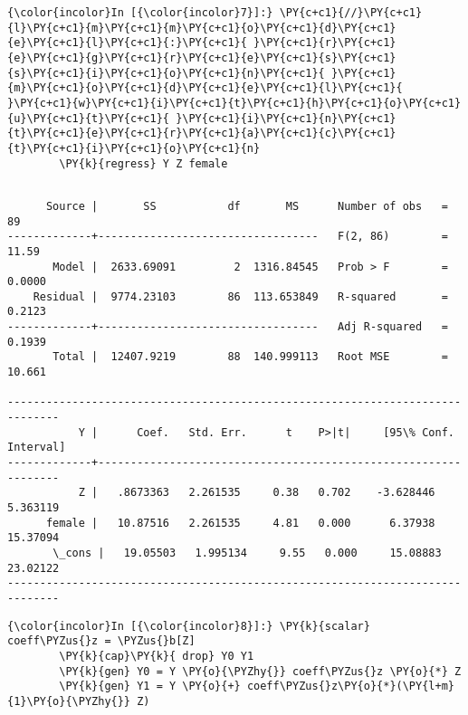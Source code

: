 \documentclass[11pt,notitlepage]{article}\usepackage[]{graphicx}\usepackage[]{color}
\makeatletter
\newenvironment{kframe}{%
 \def\at@end@of@kframe{}%
 \ifinner\ifhmode%
  \def\at@end@of@kframe{\end{minipage}}%
  \begin{minipage}{\columnwidth}%
 \fi\fi%
 \def\FrameCommand##1{\hskip\@totalleftmargin \hskip-\fboxsep
 \colorbox{shadecolor}{##1}\hskip-\fboxsep
     \hskip-\linewidth \hskip-\@totalleftmargin \hskip\columnwidth}%
 \MakeFramed {\advance\hsize-\width
   \@totalleftmargin\z@ \linewidth\hsize
   \@setminipage}}%
 {\par\unskip\endMakeFramed%
 \at@end@of@kframe}
\newenvironment{knitrout}{}{} %
\makeatother
\begin{document}
\begin{enumerate}[a)]
\begin{knitrout}
\begin{kframe}
    \begin{Verbatim}[commandchars=\\\{\}]
{\color{incolor}In [{\color{incolor}7}]:} \PY{c+c1}{//}\PY{c+c1}{l}\PY{c+c1}{m}\PY{c+c1}{m}\PY{c+c1}{o}\PY{c+c1}{d}\PY{c+c1}{e}\PY{c+c1}{l}\PY{c+c1}{:}\PY{c+c1}{ }\PY{c+c1}{r}\PY{c+c1}{e}\PY{c+c1}{g}\PY{c+c1}{r}\PY{c+c1}{e}\PY{c+c1}{s}\PY{c+c1}{s}\PY{c+c1}{i}\PY{c+c1}{o}\PY{c+c1}{n}\PY{c+c1}{ }\PY{c+c1}{m}\PY{c+c1}{o}\PY{c+c1}{d}\PY{c+c1}{e}\PY{c+c1}{l}\PY{c+c1}{ }\PY{c+c1}{w}\PY{c+c1}{i}\PY{c+c1}{t}\PY{c+c1}{h}\PY{c+c1}{o}\PY{c+c1}{u}\PY{c+c1}{t}\PY{c+c1}{ }\PY{c+c1}{i}\PY{c+c1}{n}\PY{c+c1}{t}\PY{c+c1}{e}\PY{c+c1}{r}\PY{c+c1}{a}\PY{c+c1}{c}\PY{c+c1}{t}\PY{c+c1}{i}\PY{c+c1}{o}\PY{c+c1}{n}
        \PY{k}{regress} Y Z female
\end{Verbatim}

    \begin{Verbatim}[commandchars=\\\{\}]

      Source |       SS           df       MS      Number of obs   =        89
-------------+----------------------------------   F(2, 86)        =     11.59
       Model |  2633.69091         2  1316.84545   Prob > F        =    0.0000
    Residual |  9774.23103        86  113.653849   R-squared       =    0.2123
-------------+----------------------------------   Adj R-squared   =    0.1939
       Total |  12407.9219        88  140.999113   Root MSE        =    10.661

------------------------------------------------------------------------------
           Y |      Coef.   Std. Err.      t    P>|t|     [95\% Conf. Interval]
-------------+----------------------------------------------------------------
           Z |   .8673363   2.261535     0.38   0.702    -3.628446    5.363119
      female |   10.87516   2.261535     4.81   0.000      6.37938    15.37094
       \_cons |   19.05503   1.995134     9.55   0.000     15.08883    23.02122
------------------------------------------------------------------------------

    \end{Verbatim}

    \begin{Verbatim}[commandchars=\\\{\}]
{\color{incolor}In [{\color{incolor}8}]:} \PY{k}{scalar} coeff\PYZus{}z = \PYZus{}b[Z]
        \PY{k}{cap}\PY{k}{ drop} Y0 Y1
        \PY{k}{gen} Y0 = Y \PY{o}{\PYZhy{}} coeff\PYZus{}z \PY{o}{*} Z
        \PY{k}{gen} Y1 = Y \PY{o}{+} coeff\PYZus{}z\PY{o}{*}(\PY{l+m}{1}\PY{o}{\PYZhy{}} Z)
        

\end{Verbatim}
\end{kframe}
\end{knitrout}
\end{enumerate}
\end{document}
